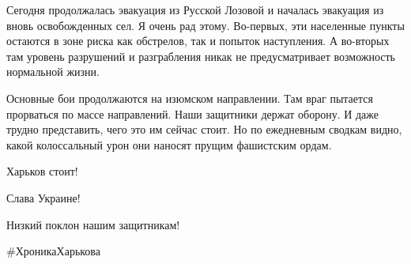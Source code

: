 Сегодня продолжалась эвакуация из Русской Лозовой и началась эвакуация из вновь
освобожденных сел. Я очень рад этому. Во-первых, эти населенные пункты остаются
в зоне риска как обстрелов, так и попыток наступления. А во-вторых там уровень
разрушений и разграбления никак не предусматривает возможность нормальной
жизни. 

Основные бои продолжаются на изюмском направлении. Там враг пытается прорваться
по массе направлений. Наши защитники держат оборону. И даже трудно представить,
чего это им сейчас стоит. Но по ежедневным сводкам видно, какой колоссальный
урон они наносят прущим фашистским ордам. 

Харьков стоит!

Слава Украине!

Низкий поклон нашим защитникам!

\#ХроникаХарькова

